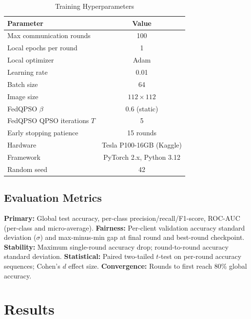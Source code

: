 \documentclass[conference]{IEEEtran}
\begin{document}
\begin{table}[htbp]
\caption{Training Hyperparameters}
\label{tab:hyperparams}
\begin{center}
\begin{tabular}{lc}
\hline
\textbf{Parameter} & \textbf{Value}\\
\hline
Max communication rounds         & 100\\
Local epochs per round           & 1\\
Local optimizer                  & Adam\\
Learning rate                    & 0.01\\
Batch size                       & 64\\
Image size                       & $112 \times 112$\\
FedQPSO $\beta$                  & 0.6 (static)\\
FedQPSO QPSO iterations $T$      & 5\\
Early stopping patience          & 15 rounds\\
Hardware                         & Tesla P100-16GB (Kaggle)\\
Framework                        & PyTorch 2.x, Python 3.12\\
Random seed                      & 42\\
\hline
\end{tabular}
\end{center}
\end{table}

\subsection{Evaluation Metrics}
\textbf{Primary:} Global test accuracy, per-class precision/recall/F1-score,
ROC-AUC (per-class and micro-average).
\textbf{Fairness:} Per-client validation accuracy standard deviation
($\sigma$) and max-minus-min gap at final round and best-round checkpoint.
\textbf{Stability:} Maximum single-round accuracy drop; round-to-round
accuracy standard deviation.
\textbf{Statistical:} Paired two-tailed $t$-test on per-round accuracy
sequences; Cohen's $d$ effect size.
\textbf{Convergence:} Rounds to first reach 80\% global accuracy.

\section{Results}
\label{sec:results}
\end{document}
